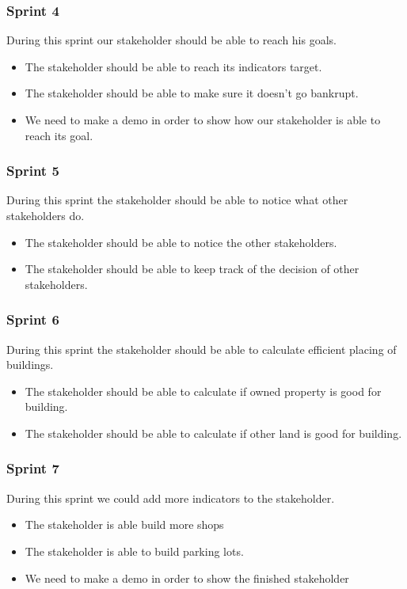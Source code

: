 \subsubsection{Sprint 4}
During this sprint our stakeholder should be able to reach his goals.
\begin{itemize}
	\item The stakeholder should be able to reach its indicators target.
	\item The stakeholder should be able to make sure it doesn't go bankrupt.
	\item We need to make a demo in order to show how our stakeholder is able to reach its goal.
\end{itemize} 

\subsubsection{Sprint 5}
During this sprint the stakeholder should be able to notice what other stakeholders do.
\begin{itemize}
	\item The stakeholder should be able to notice the other stakeholders.
	\item The stakeholder should be able to keep track of the decision of other stakeholders.
\end{itemize}

\subsubsection{Sprint 6}
During this sprint the stakeholder should be able to calculate efficient placing of buildings.
\begin{itemize}
	\item The stakeholder should be able to calculate if owned property is good for building.
	\item The stakeholder should be able to calculate if other land is good for building.
\end{itemize}

\subsubsection{Sprint 7}
During this sprint we could add more indicators to the stakeholder.
\begin{itemize}
	\item The stakeholder is able build more shops
	\item The stakeholder is able to build parking lots.
	\item We need to make a demo in order to show the finished stakeholder
\end{itemize}

